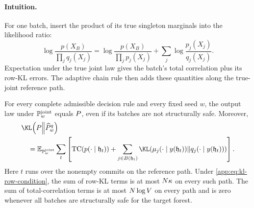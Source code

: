 \paragraph{Intuition.}
For one batch, insert the product of its true singleton marginals into
the likelihood ratio:
\[
 \log\frac{p(X_B)}{\prod_jq_j(X_j)}
 =\log\frac{p(X_B)}{\prod_jp_j(X_j)}
  +\sum_j\log\frac{p_j(X_j)}{q_j(X_j)}.
\]
Expectation under the true joint law gives the batch's total correlation
plus its row-KL errors.  The adaptive chain rule then adds these quantities
along the true-joint reference path.

\begin{lemma}
\label{app:lem:adaptive-joint-kl}
For every complete admissible decision rule and every fixed seed $w$, the output
law under $\mathbb P_{w}^{\mathrm{joint}}$ equals $P$, even if its batches
are not structurally safe.  Moreover,
\begin{equation}
\begin{aligned}
 &\KLDivergence{\TargetLaw}{\SamplerOutputLaw{w}{\FrozenOracle}}\\
 &\quad=\mathbb E_{\JointReferenceLaw{w}}\sum_t
 \left[
  \mathrm{TC}(\JointBatchLaw{\mathfrak h_t})
  +\sum_{j\in B(\mathfrak h_t)}
    \KLDivergence{\ExactRow{y(\mathfrak h_t)}{j}}{\OracleRow{y(\mathfrak h_t)}{j}}
 \right].
\end{aligned}
 \label{app:eq:adaptive-joint-kl}
\end{equation}
Here $t$ runs over the nonempty commits on the reference path.  Under
\eqref{app:eq:kl-row-condition}, the sum of row-KL terms is at most
$N\kappa$ on every such path.  The sum of total-correlation terms
is at most $N\log V$ on every path and is zero whenever all batches
are structurally safe for the target forest.
\end{lemma}

